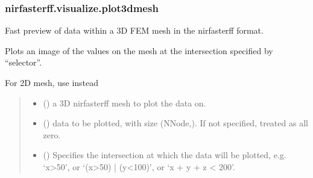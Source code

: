 \documentclass[letterpaper,10pt,english]{sphinxmanual}
\begin{document}
\subsubsection{nirfasterff.visualize.plot3dmesh}
\label{\detokenize{_autosummary/nirfasterff.visualize.plot3dmesh:nirfasterff-visualize-plot3dmesh}}\label{\detokenize{_autosummary/nirfasterff.visualize.plot3dmesh::doc}}

\begin{fulllineitems}
\label{\detokenize{_autosummary/nirfasterff.visualize.plot3dmesh:nirfasterff.visualize.plot3dmesh}}
\pysigstartsignatures
{}
\pysigstopsignatures
\sphinxAtStartPar
Fast preview of data within a 3D FEM mesh in the nirfasterff format.

\sphinxAtStartPar
Plots an image of the values on the mesh at the intersection specified by “selector”.

\sphinxAtStartPar
For 2D mesh, use {\hyperref[\detokenize{_autosummary/nirfasterff.visualize.plotimage:nirfasterff.visualize.plotimage}]{}} instead
\begin{quote}\begin{description}
\begin{itemize}
\item {} 
\sphinxAtStartPar
{} () \textendash{} a 3D nirfasterff mesh to plot the data on.

\item {} 
\sphinxAtStartPar
{} (\sphinxstyleliteralemphasis{\sphinxupquote{, }}) \textendash{} data to be plotted, with size (NNode,). If not specified, treated as all zero.

\item {} 
\sphinxAtStartPar
{} (\sphinxstyleliteralemphasis{\sphinxupquote{, }}) \textendash{} 
\sphinxAtStartPar
Specifies the intersection at which the data will be plotted, e.g. ‘x\textgreater{}50’, or ‘(x\textgreater{}50) | (y\textless{}100)’, or ‘x + y + z \textless{} 200’.


\end{itemize}
\end{description}
\end{quote}
\end{fulllineitems}
\end{document}
